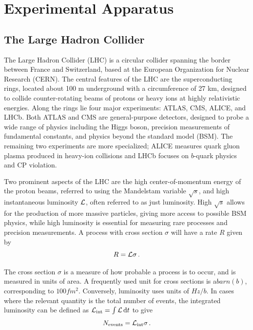 
\chapter{Experimental Apparatus}
\label{chap:exp}

\section{The Large Hadron Collider} \label{sec:LHC}
The Large Hadron Collider (LHC) is a circular collider spanning the border between France and Switzerland, based at the European Organization for Nuclear Research (CERN). The central features of the LHC are the superconducting rings, located about 100 m underground with a circumference of 27 km, designed to collide counter-rotating beams of protons or heavy ions at highly relativistic energies. Along the rings lie four major experiments: ATLAS, CMS, ALICE, and LHCb. Both ATLAS and CMS are general-purpose detectors, designed to probe a wide range of physics including the Higgs boson, precision measurements of fundamental constants, and physics beyond the standard model (BSM). The remaining two experiments are more specialized; ALICE measures quark gluon plasma produced in heavy-ion collisions and LHCb focuses on $b$-quark physics and CP violation.

Two prominent aspects of the LHC are the high center-of-momentum energy of the proton beams, referred to using the Mandelstam variable $\sqrt{s}$, and high instantaneous luminosity $\mathcal{L}$, often referred to as just luminosity. High $\sqrt{s}$ allows for the production of more massive particles, giving more access to possible BSM physics, while high luminosity is essential for measuring rare processes and precision measurements. A process with cross section $\sigma$ will have a rate $R$ given by
\begin{equation}
	R=\mathcal{L}\sigma\,.
\end{equation}

The cross section $\sigma$ is a measure of how probable a process is to occur, and is measured in units of area. A frequently used unit for cross sections is a$\unit{barn}\unit{(b)}$, corresponding to $100\unit{fm^2}$. Conversely, luminosity uses units of $\unit{Hz/b}$. In cases where the relevant quantity is the total number of events, the integrated luminosity can be defined as $\intlumi=\int{\lumi\dd{t}}$ to give
\begin{equation}
	N_\mathrm{events} = \mathcal{L}_\mathrm{int}\sigma\,.
\end{equation}

